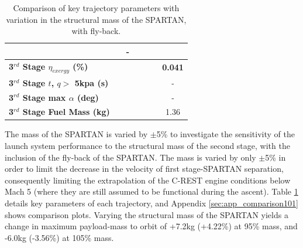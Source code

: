 \begin{table}[ht]
\begin{tabular}{l c c c c c c}
	& \returnFuelmSPARTANOneHundredFive
	& -
	\\
	\hline 
	\textbf{3$^{rd}$ Stage $\eta_{exergy}$ (\%)}
	& \textbf{\thirddExergyEffmSPARTANNinetyFive}
	& \textbf{\thirddExergyEffmSPARTANNinetySevenFive}
	& \textbf{\thirddExergyEffmSPARTANStandard}
	& \textbf{\thirddExergyEffmSPARTANOneHundredTwoFive}
	& \textbf{\thirddExergyEffmSPARTANOneHundredFive}
	& \textbf{0.041}
	\\
	\textbf{3$^{rd}$ Stage $t$, $q >$ 5kpa (s)}
	& \thirdqOverFivemSPARTANNinetyFive
	& \thirdqOverFivemSPARTANNinetySevenFive
	& \thirdqOverFivemSPARTANStandard
	& \thirdqOverFivemSPARTANOneHundredTwoFive
	& \thirdqOverFivemSPARTANOneHundredFive
	& -
	\\
	\textbf{3$^{rd}$ Stage max $\alpha$ (deg)}
	& \thirdmaxAoAmSPARTANNinetyFive
	& \thirdmaxAoAmSPARTANNinetySevenFive
	& \thirdmaxAoAmSPARTANStandard
	& \thirdmaxAoAmSPARTANOneHundredTwoFive
	& \thirdmaxAoAmSPARTANOneHundredFive
	& -
	\\
	\textbf{3$^{rd}$ Stage Fuel Mass (kg)}
	& \thirdmFuelmSPARTANNinetyFive
	& \thirdmFuelmSPARTANNinetySevenFive
	& \thirdmFuelmSPARTANStandard
	& \thirdmFuelmSPARTANOneHundredTwoFive
	& \thirdmFuelmSPARTANOneHundredFive
	&1.36
	\\
	\hline 
\end{tabular}
\caption{Comparison of key trajectory parameters with variation in the structural mass of the SPARTAN, with fly-back.}
\label{tab:comparison101}
\end{table}


The mass of the SPARTAN is varied by $\pm$5\% to investigate the sensitivity of the launch system performance to the structural mass of the second stage, with the inclusion of the fly-back of the SPARTAN. The mass is varied by only $\pm$5\% in order to limit the decrease in the velocity of first stage-SPARTAN separation, consequently limiting the extrapolation of the C-REST engine conditions below Mach 5 (where they are still assumed to be functional during the ascent).
Table \ref{tab:comparison101} details key parameters of each trajectory, and Appendix \ref{sec:app_comparison101} shows comparison plots.
Varying the structural mass of the SPARTAN yields a change in maximum payload-mass to orbit of +7.2kg (+4.22\%) at 95\% mass, and -6.0kg (-3.56\%) at 105\% mass. 

